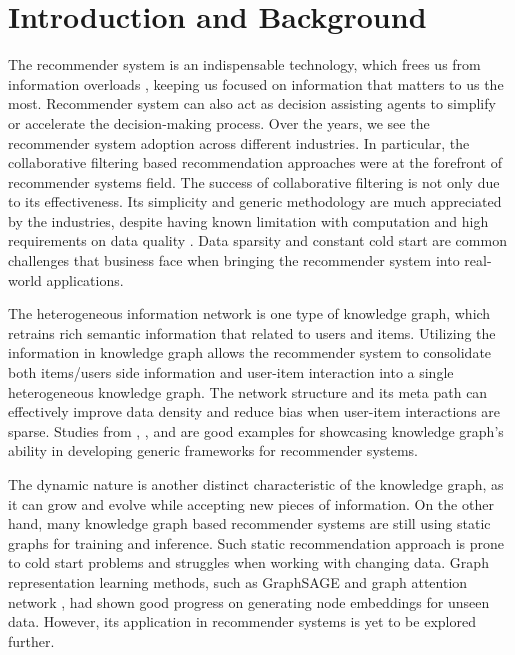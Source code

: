 
\section{Introduction and Background}
The recommender system is an indispensable technology, which frees us from information overloads \citep{Lu2015}, keeping us focused on information that matters to us the most. Recommender system can also act as decision assisting agents to simplify or accelerate the decision-making process. Over the years, we see the recommender system adoption across different industries. In particular, the collaborative filtering based recommendation approaches were at the forefront of recommender systems field. The success of collaborative filtering is not only due to its effectiveness. Its simplicity and generic methodology are much appreciated by the industries, despite having known limitation with computation and high requirements on data quality \citep{Amatriain2016}. Data sparsity and constant cold start are common challenges that business face when bringing the recommender system into real-world applications. 

The heterogeneous information network \citep{Song2019} is one type of knowledge graph, which retrains rich semantic information that related to users and items. Utilizing the information in knowledge graph allows the recommender system to consolidate both items/users side information and user-item interaction into a single heterogeneous knowledge graph. The network structure and its meta path can effectively improve data density and reduce bias when user-item interactions are sparse. Studies from \citet{qin2020survey}, \citet{wang2018ripplenet}, and \citet{xi2020graph} are good examples for showcasing knowledge graph's ability in developing generic frameworks for recommender systems.

The dynamic nature is another distinct characteristic of the knowledge graph, as it can grow and evolve while accepting new pieces of information. On the other hand, many knowledge graph based recommender systems are still using static graphs for training and inference. Such static recommendation approach is prone to cold start problems and struggles when working with changing data. Graph representation learning methods, such as GraphSAGE \citep{hamilton2017inductive} and graph attention network \citep{velivckovic2017graph}, had shown good progress on generating node embeddings for unseen data. However, its application in recommender systems is yet to be explored further.


